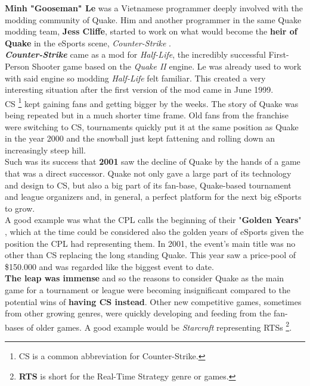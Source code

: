 \textbf{Minh "Gooseman" Le} \citep{gooseman} was a Vietnamese programmer deeply involved with the modding community of Quake. Him and another programmer in the same Quake modding team, \textbf{Jess Cliffe}, started to work on what would become the \textbf{heir of Quake} in the eSports scene, \textit{Counter-Strike} \citep{game:cs}.\\

\textit{\textbf{Counter-Strike}} came as a mod for \textit{Half-Life}, the incredibly successful First-Person Shooter game based on the \textit{Quake II} engine. Le was already used to work with said engine so modding \textit{Half-Life} felt familiar. This created a very interesting situation after the first version of the mod came in June 1999.\\

CS \footnote{CS is a common abbreviation for Counter-Strike.} kept gaining fans and getting bigger by the weeks. The story of Quake was being repeated but in a much shorter time frame. Old fans from the franchise were switching to CS, tournaments quickly put it at the same position as Quake in the year 2000 and the snowball just kept fattening and rolling down an increasingly steep hill.\\

Such was its success that \textbf{2001} saw the decline of Quake by the hands of a game that was a direct successor. Quake not only gave a large part of its technology and design to CS, but also a big part of its fan-base, Quake-based tournament and league organizers and, in general, a perfect platform for the next big eSports to grow.\\

A good example was what the CPL calls the beginning of their "\textbf{Golden Years}" \citep{web:cpl}, which at the time could be considered also the golden years of eSports given the position the CPL had representing them. In 2001, the event's main title was no other than CS replacing the long standing Quake. This year saw a price-pool of \$150.000 and was regarded like the biggest event to date.\\

\textbf{The leap was immense} and so the reasons to consider Quake as the main game for a tournament or league were becoming insignificant compared to the potential wins of \textbf{having CS instead}. Other new competitive games, sometimes from other growing genres, were quickly developing and feeding from the fan-bases of older games. A good example would be \textit{Starcraft} \citep{game:starcraft} representing RTSs \footnote{\textbf{RTS} is short for the Real-Time Strategy genre or games.}.\\

